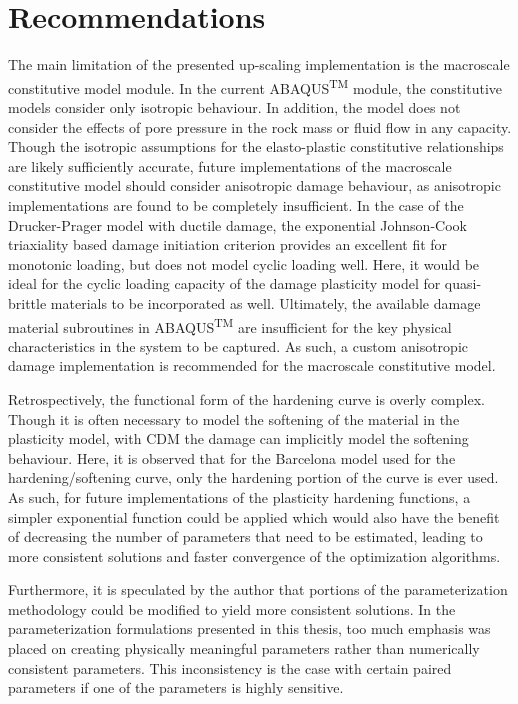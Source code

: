 \section{Recommendations}

The main limitation of the presented up-scaling implementation is the macroscale constitutive model module. In the current ABAQUS\textsuperscript{TM} module, the constitutive models consider only isotropic behaviour. In addition, the model does not consider the effects of pore pressure in the rock mass or fluid flow in any capacity. Though the isotropic assumptions for the elasto-plastic constitutive relationships are likely sufficiently accurate, future implementations of the macroscale constitutive model should consider anisotropic damage behaviour, as anisotropic implementations are found to be completely insufficient. In the case of the Drucker-Prager model with ductile damage, the exponential Johnson-Cook triaxiality based damage initiation criterion provides an excellent fit for monotonic loading, but does not model cyclic loading well. Here, it would be ideal for the cyclic loading capacity of the damage plasticity model for quasi-brittle materials to be incorporated as well. Ultimately, the available damage material subroutines in ABAQUS\textsuperscript{TM} are insufficient for the key physical characteristics in the system to be captured. As such, a custom anisotropic damage implementation is recommended for the macroscale constitutive model.

Retrospectively, the functional form of the hardening curve is overly complex. Though it is often necessary to model the softening of the material in the plasticity model, with CDM the damage can implicitly model the softening behaviour. Here, it is observed that for the Barcelona model used for the hardening/softening curve, only the hardening portion of the curve is ever used. As such, for future implementations of the plasticity hardening functions, a simpler exponential function could be applied which would also have the benefit of decreasing the number of parameters that need to be estimated, leading to more consistent solutions and faster convergence of the optimization algorithms. 

Furthermore, it is speculated by the author that portions of the parameterization methodology could be modified to yield more consistent solutions. In the parameterization formulations presented in this thesis, too much emphasis was placed on creating physically meaningful parameters rather than numerically consistent parameters. This inconsistency is the case with certain paired parameters if one of the parameters is highly sensitive.

